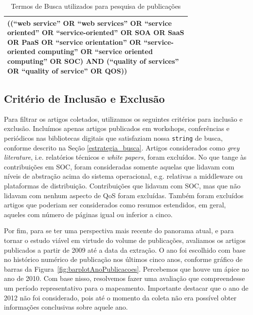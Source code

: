\begin{table}[ht]
\centering
\caption{Termos de Busca utilizados para pesquisa de publicações}
\label{tab:exTable1}
\begin{tabular}{p{0.75\linewidth}}
\hline
((``web service'' OR ``web services'' OR ``service oriented'' OR ``service-oriented'' OR SOA OR SaaS OR PaaS OR ``service orientation'' OR ``service-oriented computing'' OR ``service oriented computing'' OR SOC) AND (``quality of services'' OR ``quality of service'' OR QOS)) \\
\hline
\end{tabular}
\end{table}


\subsection{Crit\'{e}rio de Inclusão e Exclusão}

Para filtrar os artigos coletados, utilizamos os seguintes critérios para inclus\~{a}o e exclus\~{a}o. Inclu\'{i}mos apenas artigos publicados em workshops, confer\^{e}ncias e peri\'{o}dicos nas bibliotecas digitais que satisfaziam nossa \texttt{string} de busca, conforme descrito na Se\c{c}\~{a}o \ref{estrategia_busca}. Artigos considerados como \emph{grey literature}, i.e. relat\'{o}rios t\'{e}cnicos e \emph{white papers}, foram exclu\'{i}dos. No que tange \`{a}s contribui\c{c}\~{o}es em SOC, foram consideradas somente aquelas que lidavam com n\'{i}veis de abstra\c{c}\~{a}o acima do sistema operacional, e.g. relativas a middleware ou plataformas de distribui\c{c}\~{a}o. Contribui\c{c}\~{o}es que lidavam com SOC, mas que n\~{a}o lidavam com nenhum aspecto de QoS foram exclu\'{i}das. Tamb\'{e}m foram exclu\'{i}dos artigos que poderiam ser considerados como resumos estendidos, em geral, aqueles com n\'{u}mero de p\'{a}ginas igual ou inferior a cinco. 

Por fim, para se ter uma perspectiva mais recente do panorama atual, e para tornar o estudo vi\'{a}vel em virtude do volume de publica\c{c}\~{o}es, avaliamos os artigos publicados a partir de 2009 at\'{e} a data da extra\c{c}\~{a}o. O ano foi escolhido com base no hist\'{o}rico num\'{e}rico de publica\c{c}\~{a}o nos \'{u}ltimos cinco anos, conforme gr\'{a}fico de barras da  Figura~\ref{fig:barplotAnoPublicacoes}. Percebemos que houve um \'{a}pice no ano de 2010. Com base nisso, resolvemos fazer uma avalia\c{c}\~{a}o que compreendesse um per\'{i}odo representativo para o mapeamento. Importante destacar que o ano de 2012 n\~{a}o foi considerado, pois at\'{e} o momento da coleta n\~{a}o era poss\'{i}vel obter informa\c{c}\~{o}es conclusivas sobre aquele ano.

